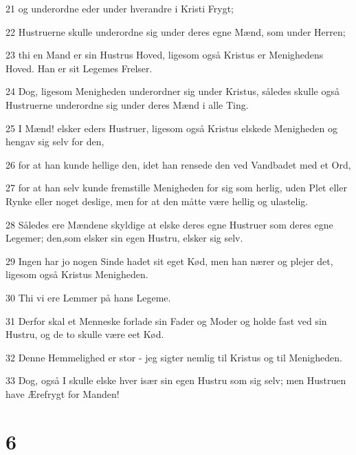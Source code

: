 \par 21 og underordne eder under hverandre i Kristi Frygt;
\par 22 Hustruerne skulle underordne sig under deres egne Mænd, som under Herren;
\par 23 thi en Mand er sin Hustrus Hoved, ligesom også Kristus er Menighedens Hoved. Han er sit Legemes Frelser.
\par 24 Dog, ligesom Menigheden underordner sig under Kristus, således skulle også Hustruerne underordne sig under deres Mænd i alle Ting.
\par 25 I Mænd! elsker eders Hustruer, ligesom også Kristus elskede Menigheden og hengav sig selv for den,
\par 26 for at han kunde hellige den, idet han rensede den ved Vandbadet med et Ord,
\par 27 for at han selv kunde fremstille Menigheden for sig som herlig, uden Plet eller Rynke eller noget deslige, men for at den måtte være hellig og ulastelig.
\par 28 Således ere Mændene skyldige at elske deres egne Hustruer som deres egne Legemer; den,som elsker sin egen Hustru, elsker sig selv.
\par 29 Ingen har jo nogen Sinde hadet sit eget Kød, men han nærer og plejer det, ligesom også Kristus Menigheden.
\par 30 Thi vi ere Lemmer på hans Legeme.
\par 31 Derfor skal et Menneske forlade sin Fader og Moder og holde fast ved sin Hustru, og de to skulle være eet Kød.
\par 32 Denne Hemmelighed er stor - jeg sigter nemlig til Kristus og til Menigheden.
\par 33 Dog, også I skulle elske hver især sin egen Hustru som sig selv; men Hustruen have Ærefrygt for Manden!

\chapter{6}

